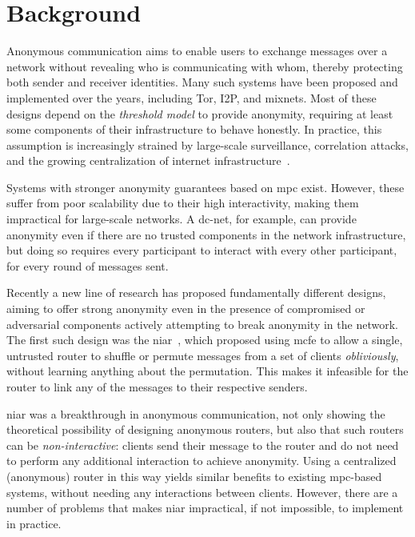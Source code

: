 \chapter{Background}
\label{chp:background}

Anonymous communication aims to enable users to exchange messages over a network without revealing who is communicating with whom, thereby protecting both sender and receiver identities. Many such systems have been proposed and implemented over the years, including Tor, I2P, and mixnets. Most of these designs depend on the \emph{threshold model} to provide anonymity, requiring at least some components of their infrastructure to behave honestly. In practice, this assumption is increasingly strained by large-scale surveillance, correlation attacks, and the growing centralization of internet infrastructure~\cite{sun:2015:RAPTOR}.

Systems with stronger anonymity guarantees based on \gls{mpc} exist. However, these suffer from poor scalability due to their high interactivity, making them impractical for large-scale networks. A \gls{dc-net}, for example, can provide anonymity even if there are no trusted components in the network infrastructure, but doing so requires every participant to interact with every other participant, for every round of messages sent.

Recently a new line of research has proposed fundamentally different designs, aiming to offer strong anonymity even in the presence of compromised or adversarial components actively attempting to break anonymity in the network. The first such design was the \gls{niar}~\cite{cryptoeprint:2021/435}, which proposed using \gls{mcfe} to allow a single, untrusted router to shuffle or permute messages from a set of clients \emph{obliviously}, without learning anything about the permutation. This makes it infeasible for the router to link any of the messages to their respective senders.

\gls{niar} was a breakthrough in anonymous communication, not only showing the theoretical possibility of designing anonymous routers, but also that such routers can be \emph{non-interactive}: clients send their message to the router and do not need to perform any additional interaction to achieve anonymity. Using a centralized (anonymous) router in this way yields similar benefits to existing \gls{mpc}-based systems, without needing any interactions between clients. However, there are a number of problems that makes \gls{niar} impractical, if not impossible, to implement in practice.

